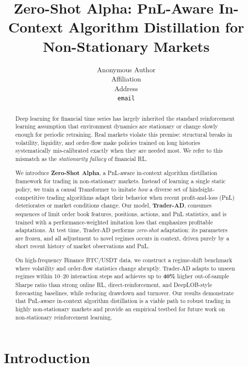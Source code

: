 \documentclass{article}
\title{Zero-Shot Alpha: PnL-Aware In-Context Algorithm Distillation for Non-Stationary Markets}
\author{%
  Anonymous Author \\
  Affiliation \\
  Address \\
  \texttt{email} \\
}
\date{} %
\begin{document}
\maketitle

\begin{abstract}
Deep learning for financial time series has largely inherited the standard reinforcement learning assumption that environment dynamics are stationary or change slowly enough for periodic retraining. Real markets violate this premise: structural breaks in volatility, liquidity, and order-flow make policies trained on long histories systematically mis-calibrated exactly when they are needed most. We refer to this mismatch as the \emph{stationarity fallacy} of financial RL.

We introduce \textbf{Zero-Shot Alpha}, a PnL-aware in-context algorithm distillation framework for trading in non-stationary markets. Instead of learning a single static policy, we train a causal Transformer to imitate \emph{how} a diverse set of hindsight-competitive trading algorithms adapt their behavior when recent profit-and-loss (PnL) deteriorates or market conditions change. Our model, \textbf{Trader-AD}, consumes sequences of limit order book features, positions, actions, and PnL statistics, and is trained with a performance-weighted imitation loss that emphasizes profitable adaptations. At test time, Trader-AD performs \emph{zero-shot} adaptation: its parameters are frozen, and all adjustment to novel regimes occurs in context, driven purely by a short recent history of market observations and PnL.

On high-frequency Binance BTC/USDT data, we construct a regime-shift benchmark where volatility and order-flow statistics change abruptly. Trader-AD adapts to unseen regimes within 10--20 interaction steps and achieves up to \textbf{40\%} higher out-of-sample Sharpe ratio than strong online RL, direct-reinforcement, and DeepLOB-style forecasting baselines, while reducing drawdown and turnover. Our results demonstrate that PnL-aware in-context algorithm distillation is a viable path to robust trading in highly non-stationary markets and provide an empirical testbed for future work on non-stationary reinforcement learning.
\end{abstract}

\section{Introduction}
\label{sec:intro}
\end{document}
